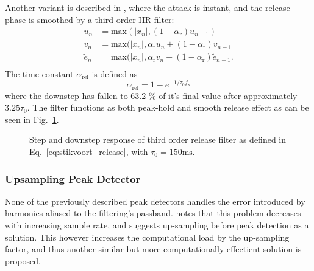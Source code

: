 \documentclass[../main2.tex]{subfiles}
\providecommand{\rootdir}{..}
\begin{document}
Another variant is described in \cite{stikvoort1986digital}, where the attack is instant, and the release phase is smoothed by a third order IIR filter:\begin{equation}\label{eq:stikvoort_release}
\begin{split}
u_n &= \text{max}(|x_n|, (1-\alpha_{\text{r}}) u_{n-1}) \\
v_n &= \text{max}(|x_n|, \alpha_{\text{r}} u_n + (1-\alpha_{\text{r}}) v_{n-1} \\
\tilde{e}_n &= \text{max}(|x_n|, \alpha_{\text{r}} v_n + (1-\alpha_{\text{r}}) \tilde{e}_{n-1}. \\
\end{split}
\end{equation}
The time constant $\alpha_{\text{rel}}$ is defined as
\begin{equation}
\alpha_\text{rel} = 1-e^{-1/\tau_0 f_s}
\end{equation}
where the downstep has fallen to 63.2 \% of it's final value after approximately $3.25 \tau_0$. The filter functions as both peak-hold and smooth release effect as can be seen in Fig.~\ref{fig:step_stikvoort_release}.
\begin{figure}
\centerline{}
\caption{Step and downstep response of third order release filter as defined in Eq.~\eqref{eq:stikvoort_release}, with $\tau_0 = 150 \text{ms}$.}
\label{fig:step_stikvoort_release}
\end{figure}

\subsubsection{Upsampling Peak Detector}\label{theory_upsampling_peak_det}
None of the previously described peak detectors handles the error introduced by harmonics aliased to the filtering's passband. \cite{frindle1996implementation} notes that this problem decreases with increasing sample rate, and suggests up-sampling before peak detection as a solution. This however increases the computational load by the up-sampling factor, and thus another similar but more computationally effectient solution is proposed.
\end{document}
